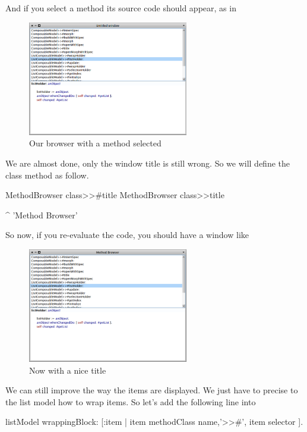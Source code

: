 \documentclass[a4paper,10pt,twoside]{book}
\begin{document}
And if you select a method its source code should appear, as in 

\begin{figure}[ht]
\begin{center}
	\includegraphics[width=7cm]{MethodBrowser3}
	\caption{Our browser with a method selected}
\end{center}
\end{figure}

We are almost done, only the window title is still wrong.
So we will define the class method  as follow.
%
\begin{method}{MethodBrowser class>>\#title}
MethodBrowser class>>title

	^ 'Method Browser'
\end{method}

So now, if you re-evaluate the code, you should have a window like 

\begin{figure}[ht]
\begin{center}
	\includegraphics[width=7cm]{MethodBrowser4}
	\caption{Now with a nice title}
\end{center}
\end{figure}

We can still improve the way the items are displayed. We just have to precise to the list model how to wrap items.
So let's add the following line into 
\begin{code}{}
listModel wrappingBlock: [:item | item methodClass name,'>>#', item selector ].
\end{code}
\end{document}
